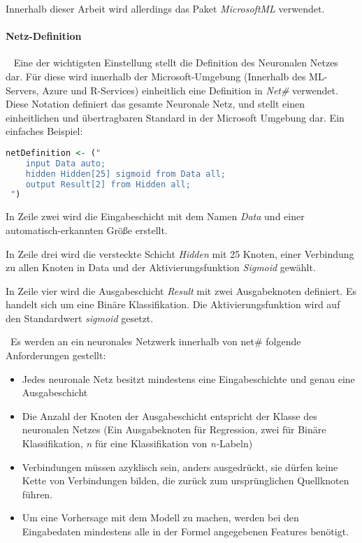 Innerhalb dieser Arbeit wird allerdings das Paket \textit{MicrosoftML} verwendet.

\paragraph{Netz-Definition} ~\newline
Eine der wichtigsten Einstellung stellt die Definition des Neuronalen Netzes dar. Für diese wird innerhalb der Microsoft-Umgebung (Innerhalb des ML-Servers, Azure und R-Services) einheitlich eine Definition in \textit{Net\#} verwendet. Diese Notation definiert  das gesamte Neuronale Netz, und stellt einen einheitlichen und übertragbaren Standard in der Microsoft Umgebung dar. Ein einfaches Beispiel: ~\newline

\begin{lstlisting}[language=R]
 netDefinition <- ("
 	input Data auto;
 	hidden Hidden[25] sigmoid from Data all;
 	output Result[2] from Hidden all;  
 ")
\end{lstlisting}

In Zeile zwei wird die Eingabeschicht mit dem Namen \textit{Data} und einer automatisch-erkannten Größe erstellt. 

In Zeile drei wird die versteckte Schicht \textit{Hidden} mit 25 Knoten, einer Verbindung zu allen Knoten in Data und der Aktivierungsfunktion \textit{Sigmoid} gewählt. 

In Zeile vier wird die Ausgabeschicht \textit{Result} mit zwei Ausgabeknoten definiert. Es handelt sich um eine Binäre Klassifikation. Die Aktivierungsfunktion wird auf den Standardwert \textit{sigmoid} gesetzt. 

~\newline Es werden an ein neuronales Netzwerk innerhalb von net\# folgende Anforderungen gestellt:

\begin{itemize}
	\item Jedes neuronale Netz besitzt mindestens eine Eingabeschichte und genau eine Ausgabeschicht
	\item Die Anzahl der Knoten der Ausgabeschicht entspricht der Klasse des neuronalen Netzes (Ein Ausgabeknoten für Regression, zwei für Binäre Klassifikation, \textit{n} für eine Klassifikation von \textit{n-}Labeln)
	\item Verbindungen müssen azyklisch sein, anders ausgedrückt, sie dürfen keine Kette von Verbindungen bilden, die zurück zum ursprünglichen Quellknoten führen.
	\item Um eine Vorhersage mit dem Modell zu machen, werden bei den Eingabedaten mindestens alle in der Formel angegebenen Features benötigt. 
\end{itemize}

